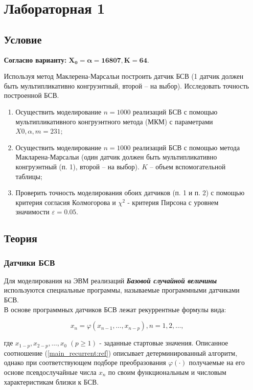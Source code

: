 \section{Лабораторная 1}

\subsection{Условие}

\textbf{Согласно варианту:} $\mathbf{X_{0} = \alpha = 16 807, K = 64}$.

Используя метод Маклерена-Марсальи построить датчик БСВ (1 датчик должен быть мультипликативно конгруэнтный, второй – на выбор). Исследовать точность построенной БСВ.

\begin{enumerate}
	\item Осуществить моделирование $n = 1000$ реализаций БСВ с помощью мультипликативного конгруэнтного метода (МКМ) с параметрами $X{0}, \alpha, m = 231$;
	\item Осуществить моделирование $n = 1000$ реализаций БСВ с помощью метода Макларена-Марсальи (один датчик должен быть мультипликативно конгруэнтный (п. 1), второй – на выбор).
	      $K$ – объем вспомогательной таблицы;
	\item Проверить точность моделирования обоих датчиков (п. 1 и п. 2) с помощью критерия согласия Колмогорова и $\chi^{2}$ - критерия Пирсона с уровнем значимости $\varepsilon = 0.05$.
\end{enumerate}

\subsection{Теория}
\subsubsection{Датчики БСВ}
Для моделирования на ЭВМ реализаций \textbf{\textit{Базовой случайной величины}} используются специальные программы, называемые программными датчиками БСВ.\\
В основе программных датчиков БСВ лежат рекуррентные формулы вида:

\begin{equation}
	x_{n} = \varphi (x_{n-1}, \ldots, x_{n-p}), n = 1, 2, \ldots ,
	\label{main_recurrent:ref}
\end{equation}

где $x_{1-p}, x_{2-p}, \ldots, x_{0}$ $(p \geqslant 1)$  - заданные стартовые значения. Описанное соотношение (\ref{main_recurrent:ref}) описывает детерминированный алгоритм, однако при соответствующем подборе преобразования $\varphi(\cdot)$ получаемые на его основе псевдослучайные числа ${x_{n}}$ по своим функциональным и числовым характеристикам близки к БСВ.

